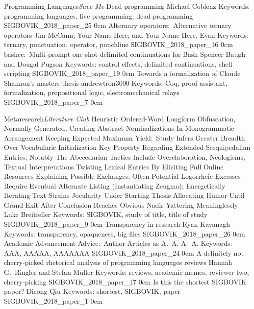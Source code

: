 \addtrack
	{Programming Languages}{\textit{Save Me}}
\addpaper
	{Dead programming}
	{Michael Coblenz}
	{Keywords: programming languages, live programming, dead programming}
	{SIGBOVIK_2018_paper_25}
	{0cm}
	{}
\addpaper
	{Alternary operators:\ Alternative ternary operators}
	{Jim McCann; Your Name Here; and Your Name Here, Evan}
	{Keywords: ternary, punctuation, operator, punchline}
	{SIGBOVIK_2018_paper_16}
	{0cm}
	{}
\addpaper
	{bashcc:\ Multi-prompt one-shot delimited continuations for Bash}
	{Spencer Baugh and Dougal Pugson}
	{Keywords: control effects, delimited continuations, shell scripting}
	{SIGBOVIK_2018_paper_19}
	{0cm}
	{}
\addpaper
	{Towards a formalization of Claude Shannon's masters thesis}
	{andrewtron3000}
	{Keywords: Coq, proof assistant, formalization, propositional logic, electromechanical relays}
	{SIGBOVIK_2018_paper_7}
	{0cm}
	{}

\addtrack
	{Metaresearch}{\textit{Literature Club}}
\addpaper
	{Heuristic Ordered-Word Longform Obfuscation, Normally Generated, Creating Abstract
	Nominalizations In Monogrammatic Arrangement Keeping Expected Maximum Yield:\ Study Infers
	Greater Breadth Over Vocabularic Initialization Key Property Regarding Extended
	Sesquipedalian Entries; Notably The Abecedarian Tactics Include Overelaboration, Neologisms,
	Textual Interpretations Twisting Lexical Entries By Eliciting Full Online Resources
	Explaining Possible Exchanges; Often Potential Logorrheic Excesses Require Eventual
	Alternate Listing (Instantiating Zeugma); Energetically Iterating Text Strains Jocularity
	Under Starting Thesis Allocating Humor Until Grand Exit After Conclusion Reaches Obvious
	Nadir Yattering Meaninglessly}
	{Luke Breitfeller}
	{Keywords: SIGBOVIK, study of title, title of study}
	{SIGBOVIK_2018_paper_9}
	{0cm}
	{}
\addpaper
	{Transparency in research}
	{Ryan Kavanagh}
	{Keywords: transparency, opaqueness, big files}
	{SIGBOVIK_2018_paper_26}
	{0cm}
	{}
\addpaper
	{Academic Advancement Advice:\ Author Articles as A.\ A.}
	{A.\ A.}
	{Keywords: AAA, AAAAA, AAAAAAA}
	{SIGBOVIK_2018_paper_24}
	{0cm}
	{}
\addpaper
	{A definitely not cherry-picked rhetorical analysis of programming languages reviews}
	{Hannah G.\ Ringler and Stefan Muller}
	{Keywords: reviews, academic memes, reviewer two, cherry-picking}
	{SIGBOVIK_2018_paper_17}
	{0cm}
	{}
\addpaper
	{Is this the shortest SIGBOVIK paper?}
	{Dicong Qiu}
	{Keywords: shortest, SIGBOVIK, paper}
	{SIGBOVIK_2018_paper_1}
	{0cm}
	{}
